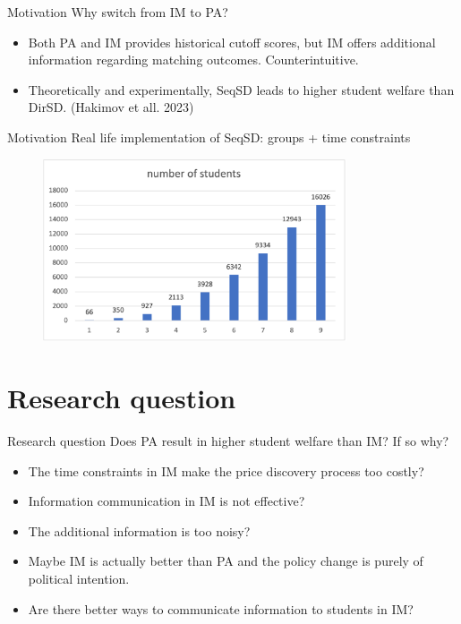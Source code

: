 \documentclass[dvipsnames,mathserif]{beamer}
\begin{document}
{\begin{frame}{Motivation}
Why switch from IM to PA?
\vspace{0.5cm}
    \begin{itemize}
        \item Both PA and IM provides historical cutoff scores, but IM offers additional information regarding matching outcomes. Counterintuitive.\\
        \vspace{0.2cm}
        \item Theoretically and experimentally, SeqSD leads to higher student welfare than DirSD. (Hakimov et all. 2023)
    \end{itemize}
\end{frame}
\begin{frame}{Motivation}
Real life implementation of SeqSD: groups + time constraints
\begin{figure}[h!]
\centering
\includegraphics[width=0.8\textwidth]{1.png}
\end{figure}
\end{frame}




\section{Research question}
\begin{frame}{Research question}
Does PA result in higher student welfare than IM? If so why?
\vspace{0.5cm}
    \begin{itemize}
    	\item The time constraints in IM make the price discovery process too costly? 
        \vspace{0.2cm}
        \item Information communication in IM is not effective? 
        \vspace{0.2cm}
        \item The additional information is too noisy? 
        \vspace{0.2cm}
        \item Maybe IM is actually better than PA and the policy change is purely of political intention. 
        \vspace{0.2cm}
        \item Are there better ways to communicate information to students in IM?
    \end{itemize}
\end{frame}

}
\end{document}
